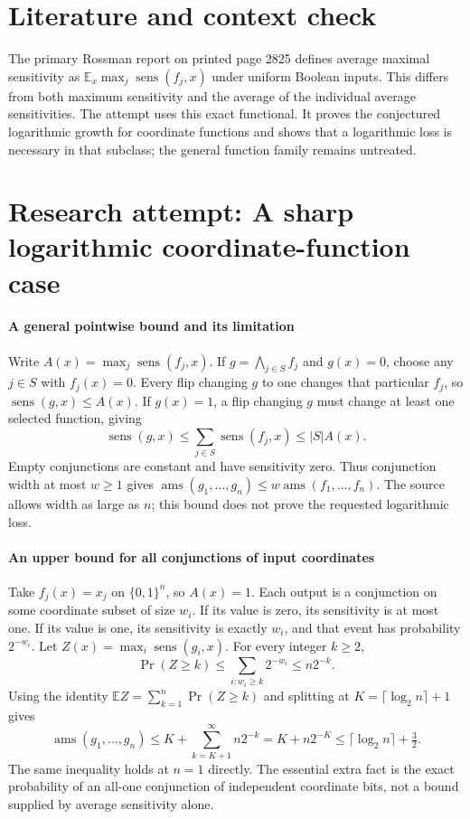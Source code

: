 \documentclass[11pt]{article}
\begin{document}
\section{Literature and context check}
The primary Rossman report on printed page 2825 defines average maximal sensitivity as $\mathbb E_x\max_j\operatorname{sens}(f_j,x)$ under uniform Boolean inputs. This differs from both maximum sensitivity and the average of the individual average sensitivities. The attempt uses this exact functional. It proves the conjectured logarithmic growth for coordinate functions and shows that a logarithmic loss is necessary in that subclass; the general function family remains untreated.
\section{Research attempt: A sharp logarithmic coordinate-function case}

\paragraph{A general pointwise bound and its limitation}
Write $A(x)=\max_j\operatorname{sens}(f_j,x)$. If $g=\bigwedge_{j\in S}f_j$ and $g(x)=0$, choose any $j\in S$ with $f_j(x)=0$. Every flip changing $g$ to one changes that particular $f_j$, so $\operatorname{sens}(g,x)\leq A(x)$. If $g(x)=1$, a flip changing $g$ must change at least one selected function, giving
\[
 \operatorname{sens}(g,x)\leq\sum_{j\in S}\operatorname{sens}(f_j,x)\leq |S|A(x).
\]
Empty conjunctions are constant and have sensitivity zero. Thus conjunction width at most $w\geq1$ gives $\operatorname{ams}(g_1,\ldots,g_n)\leq w\operatorname{ams}(f_1,\ldots,f_n)$. The source allows width as large as $n$; this bound does not prove the requested logarithmic loss.

\paragraph{An upper bound for all conjunctions of input coordinates}
Take $f_j(x)=x_j$ on $\{0,1\}^n$, so $A(x)=1$. Each output is a conjunction on some coordinate subset of size $w_i$. If its value is zero, its sensitivity is at most one. If its value is one, its sensitivity is exactly $w_i$, and that event has probability $2^{-w_i}$. Let $Z(x)=\max_i\operatorname{sens}(g_i,x)$. For every integer $k\geq2$,
\[
 \Pr(Z\geq k)\leq\sum_{i:w_i\geq k}2^{-w_i}\leq n2^{-k}.
\]
Using the identity $\mathbb EZ=\sum_{k=1}^n\Pr(Z\geq k)$ and splitting at $K=\lceil\log_2n\rceil+1$ gives
\[
 \operatorname{ams}(g_1,\ldots,g_n)
 \leq K+\sum_{k=K+1}^{\infty}n2^{-k}
 =K+n2^{-K}\leq\lceil\log_2n\rceil+\tfrac32.
\]
The same inequality holds at $n=1$ directly. The essential extra fact is the exact probability of an all-one conjunction of independent coordinate bits, not a bound supplied by average sensitivity alone.
\end{document}
